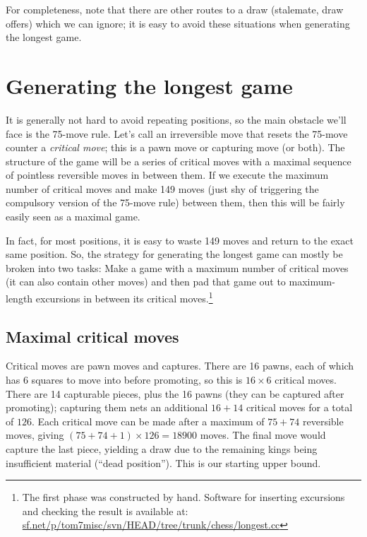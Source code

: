 \documentclass[twocolumn]{article}
\begin{document}
\medskip
For completeness, note that there are other routes to a draw
(stalemate, draw offers) which we can ignore; it is easy to avoid
these situations when generating the longest game.


\section{Generating the longest game}

It is generally not hard to avoid repeating positions, so the main
obstacle we'll face is the 75-move rule. Let's call an irreversible
move that resets the 75-move counter a {\em critical move}; this is a
pawn move or capturing move (or both). The structure of the game will
be a series of critical moves with a maximal sequence of pointless
reversible moves in between them. If we execute the maximum number of
critical moves and make 149 moves (just shy of triggering the
compulsory version of the 75-move rule) between them, then this will
be fairly easily seen as a maximal game.

In fact, for most positions, it is easy to waste 149 moves and return
to the exact same position. So, the strategy for generating the
longest game can mostly be broken into two tasks: Make a game with a
maximum number of critical moves (it can also contain other moves) and
then pad that game out to maximum-length excursions in between its
critical moves.\footnote{The first phase was constructed by hand.
  Software for inserting excursions and checking the result is
  available at:
  \url{sf.net/p/tom7misc/svn/HEAD/tree/trunk/chess/longest.cc} }

\subsection{Maximal critical moves} \label{sec:maxcritical}

Critical moves are pawn moves and captures. There are 16 pawns, each
of which has 6 squares to move into before promoting, so this is
$16\times 6$ critical moves. There are 14 capturable pieces, plus the
16 pawns (they can be captured after promoting); capturing them nets an
additional $16+14$ critical moves for a total of $126$. Each critical
move can be made after a maximum of $75+74$ reversible moves, giving
$(75+74+1) \times 126 = 18900$ moves. The final move would capture the
last piece, yielding a draw due to the remaining kings being insufficient
material (``dead position''). This is our starting upper bound.
\end{document}

